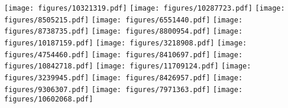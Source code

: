 \texttt{[image: figures/10321319.pdf]}
\texttt{[image: figures/10287723.pdf]}
\texttt{[image: figures/8505215.pdf]}
\texttt{[image: figures/6551440.pdf]}
\texttt{[image: figures/8738735.pdf]}
\texttt{[image: figures/8800954.pdf]}
\texttt{[image: figures/10187159.pdf]}
\texttt{[image: figures/3218908.pdf]}
\texttt{[image: figures/4754460.pdf]}
\texttt{[image: figures/8410697.pdf]}
\texttt{[image: figures/10842718.pdf]}
\texttt{[image: figures/11709124.pdf]}
\texttt{[image: figures/3239945.pdf]}
\texttt{[image: figures/8426957.pdf]}
\texttt{[image: figures/9306307.pdf]}
\texttt{[image: figures/7971363.pdf]}
\texttt{[image: figures/10602068.pdf]}
